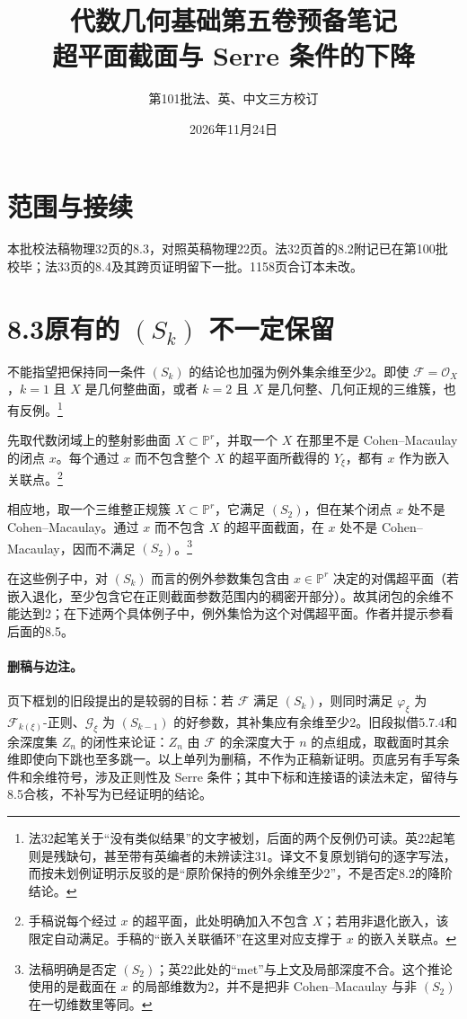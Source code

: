 \documentclass[openany,fontset=fandol]{ctexbook}
\begin{document}
\title{代数几何基础第五卷预备笔记\\超平面截面与 Serre 条件的下降}
\author{第101批\quad 法、英、中文三方校订}
\date{2026年11月24日}
\maketitle

\section*{范围与接续}
本批校法稿物理32页的8.3，对照英稿物理22页。法32页首的8.2附记已在第100批校毕；法33页的8.4及其跨页证明留下一批。1158页合订本未改。

\section*{8.3\quad 原有的 $(S_k)$ 不一定保留}
不能指望把保持同一条件 $(S_k)$ 的结论也加强为例外集余维至少2。即使 $\mathcal F=\mathcal O_X$，$k=1$ 且 $X$ 是几何整曲面，或者 $k=2$ 且 $X$ 是几何整、几何正规的三维簇，也有反例。\footnote{法32起笔关于“没有类似结果”的文字被划，后面的两个反例仍可读。英22起笔则是残缺句，甚至带有英编者的未辨读注31。译文不复原划销句的逐字写法，而按未划例证明示反驳的是“原阶保持的例外余维至少2”，不是否定8.2的降阶结论。}

先取代数闭域上的整射影曲面 $X\subset\mathbb P^r$，并取一个 $X$ 在那里不是 Cohen--Macaulay 的闭点 $x$。每个通过 $x$ 而不包含整个 $X$ 的超平面所截得的 $Y_\xi$，都有 $x$ 作为嵌入关联点。\footnote{手稿说每个经过 $x$ 的超平面，此处明确加入不包含 $X$；若用非退化嵌入，该限定自动满足。手稿的“嵌入关联循环”在这里对应支撑于 $x$ 的嵌入关联点。}

相应地，取一个三维整正规簇 $X\subset\mathbb P^r$，它满足 $(S_2)$，但在某个闭点 $x$ 处不是 Cohen--Macaulay。通过 $x$ 而不包含 $X$ 的超平面截面，在 $x$ 处不是 Cohen--Macaulay，因而不满足 $(S_2)$。\footnote{法稿明确是否定 $(S_2)$；英22此处的“met”与上文及局部深度不合。这个推论使用的是截面在 $x$ 的局部维数为2，并不是把非 Cohen--Macaulay 与非 $(S_2)$ 在一切维数里等同。}

在这些例子中，对 $(S_k)$ 而言的例外参数集包含由 $x\in\mathbb P^r$ 决定的对偶超平面（若嵌入退化，至少包含它在正则截面参数范围内的稠密开部分）。故其闭包的余维不能达到2；在下述两个具体例子中，例外集恰为这个对偶超平面。作者并提示参看后面的8.5。

\paragraph{删稿与边注。}
页下框划的旧段提出的是较弱的目标：若 $\mathcal F$ 满足 $(S_k)$，则同时满足 $\varphi_\xi$ 为 $\mathcal F_{k(\xi)}$-正则、$\mathcal G_\xi$ 为 $(S_{k-1})$ 的好参数，其补集应有余维至少2。旧段拟借5.7.4和余深度集 $Z_n$ 的闭性来论证：$Z_n$ 由 $\mathcal F$ 的余深度大于 $n$ 的点组成，取截面时其余维即使向下跳也至多跳一。以上单列为删稿，不作为正稿新证明。页底另有手写条件和余维符号，涉及正则性及 Serre 条件；其中下标和连接语的读法未定，留待与8.5合核，不补写为已经证明的结论。
\end{document}
